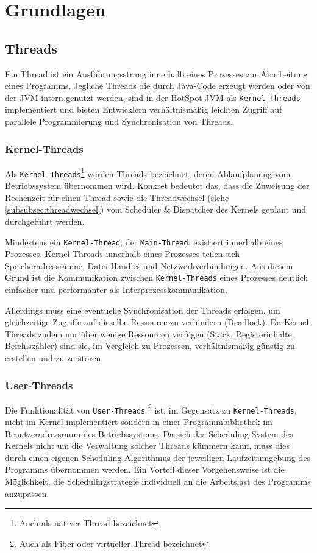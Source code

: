 \section{Grundlagen}
\label{sec:grundlagen}

\subsection{Threads}
\label{subsec:threads}
Ein Thread ist ein Ausführungsstrang innerhalb eines Prozesses zur Abarbeitung eines Programms.
Jegliche Threads die durch Java-Code erzeugt werden oder von der JVM intern genutzt werden,
sind in der HotSpot-JVM als \verb|Kernel-Threads| implementiert
und bieten Entwicklern verhältnismäßig leichten Zugriff auf parallele Programmierung und Synchronisation von Threads.
\parencite[Absatz Thread Management]{OpenJDKHotspotOverview}

\subsubsection{Kernel-Threads}
\label{subsubsec:kernel-threads}
Als \verb|Kernel-Threads|\footnote{Auch als nativer Thread bezeichnet} werden Threads bezeichnet, deren Ablaufplanung vom Betriebssystem übernommen wird.
Konkret bedeutet das, dass die Zuweisung der Rechenzeit für einen Thread sowie die Threadwechsel (siehe \ref{subsubsec:threadwechsel})
vom Scheduler \& Dispatcher des Kernels geplant und durchgeführt werden.

Mindestens ein \verb|Kernel-Thread|, der \verb|Main-Thread|, existiert innerhalb eines Prozesses. Kernel-Threads innerhalb eines Prozesses
teilen sich Speicheradressräume, Datei-Handles und Netzwerkverbindungen.
Aus diesem Grund ist die Kommunikation zwischen \verb|Kernel-Threads| eines Prozesses deutlich einfacher und performanter
als Interprozesskommunikation.

Allerdings muss eine eventuelle Synchronisation der Threads erfolgen, um gleichzeitige Zugriffe auf dieselbe Ressource zu verhindern
(Deadlock).
Da Kernel-Threads zudem nur über wenige Ressourcen verfügen (Stack, Registerinhalte, Befehlszähler) sind sie, im Vergleich zu Prozessen,
verhältnismäßig günstig zu erstellen und zu zerstören.\parencite[Kapitel 2.2.5]{Tanenbaum2016}

\subsubsection{User-Threads}
\label{subsubsec:user-threads}
Die Funktionalität von \verb|User-Threads| \footnote{Auch als Fiber oder virtueller Thread bezeichnet} ist,
im Gegensatz zu \verb|Kernel-Threads|,
nicht im Kernel implementiert sondern in einer Programmbibliothek im Benutzeradressraum des Betriebssystems.
Da sich das Scheduling-System des Kernels nicht um die Verwaltung solcher Threads kümmern kann, muss dies durch einen eigenen Scheduling-Algorithmus
der jeweiligen Laufzeitumgebung des Programms übernommen werden.
Ein Vorteil dieser Vorgehensweise ist die Möglichkeit, die Schedulingstrategie individuell an die Arbeitslast des Programms anzupassen.

